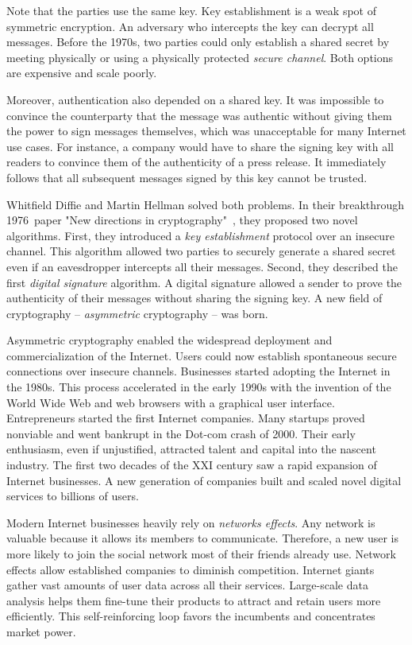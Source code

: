 Note that the parties use the same key.
Key establishment is a weak spot of symmetric encryption.
An adversary who intercepts the key can decrypt all messages.
Before the 1970s, two parties could only establish a shared secret by meeting physically or using a physically protected \textit{secure channel}.
Both options are expensive and scale poorly.

Moreover, authentication also depended on a shared key.
It was impossible to convince the counterparty that the message was authentic without giving them the power to sign messages themselves, which was unacceptable for many Internet use cases.
For instance, a company would have to share the signing key with all readers to convince them of the authenticity of a press release.
It immediately follows that all subsequent messages signed by this key cannot be trusted.

Whitfield Diffie and Martin Hellman solved both problems.
In their breakthrough 1976~paper "New directions in cryptography"~\cite{Diffie1976}, they proposed two novel algorithms.
First, they introduced a \textit{key establishment} protocol over an insecure channel.
This algorithm allowed two parties to securely generate a shared secret even if an eavesdropper intercepts all their messages.
Second, they described the first \textit{digital signature} algorithm.
A digital signature allowed a sender to prove the authenticity of their messages without sharing the signing key.
A new field of cryptography -- \textit{asymmetric} cryptography -- was born.

Asymmetric cryptography enabled the widespread deployment and commercialization of the Internet.
Users could now establish spontaneous secure connections over insecure channels.
Businesses started adopting the Internet in the 1980s.
This process accelerated in the early 1990s with the invention of the World Wide Web and web browsers with a graphical user interface.
Entrepreneurs started the first Internet companies.
Many startups proved nonviable and went bankrupt in the Dot-com crash of 2000.
Their early enthusiasm, even if unjustified, attracted talent and capital into the nascent industry.
The first two decades of the XXI century saw a rapid expansion of Internet businesses.
A new generation of companies built and scaled novel digital services to billions of users.

Modern Internet businesses heavily rely on \textit{networks effects}.
Any network is valuable because it allows its members to communicate.
Therefore, a new user is more likely to join the social network most of their friends already use.
Network effects allow established companies to diminish competition.
Internet giants gather vast amounts of user data across all their services.
Large-scale data analysis helps them fine-tune their products to attract and retain users more efficiently.
This self-reinforcing loop favors the incumbents and concentrates market power.


